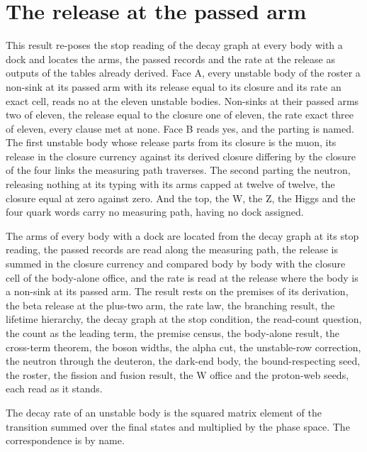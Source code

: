 \section{The release at the passed arm}\label{mod:IX-1-D538074-w-rpar}
\begin{chwall}\label{box:IX-1-D538074-w-rpar:1}
This result re-poses the stop reading of the decay graph at every body with a dock and locates the arms, the passed records and the rate at the release as outputs of the tables already derived. Face A, every unstable body of the roster a non-sink at its passed arm with its release equal to its closure and its rate an exact cell, reads no at the eleven unstable bodies. Non-sinks at their passed arms two of eleven, the release equal to the closure one of eleven, the rate exact three of eleven, every clause met at none. Face B reads yes, and the parting is named. The first unstable body whose release parts from its closure is the muon, its release in the closure currency against its derived closure differing by the closure of the four links the measuring path traverses. The second parting the neutron, releasing nothing at its typing with its arms capped at twelve of twelve, the closure equal at zero against zero. And the top, the W, the Z, the Higgs and the four quark words carry no measuring path, having no dock assigned.
\end{chwall}
The arms of every body with a dock are located from the decay graph at its stop reading, the passed records are read along the measuring path, the release is summed in the closure currency and compared body by body with the closure cell of the body-alone office, and the rate is read at the release where the body is a non-sink at its passed arm. The result rests on the premises of its derivation, the beta release at the plus-two arm, the rate law, the branching result, the lifetime hierarchy, the decay graph at the stop condition, the read-count question, the count as the leading term, the premise census, the body-alone result, the cross-term theorem, the boson widths, the alpha cut, the unstable-row correction, the neutron through the deuteron, the dark-end body, the bound-respecting seed, the roster, the fission and fusion result, the W office and the proton-web seeds, each read as it stands.
\begin{chbridge}
The decay rate of an unstable body is the squared matrix element of the transition summed over the final states and multiplied by the phase space. The correspondence is by name.
\end{chbridge}
